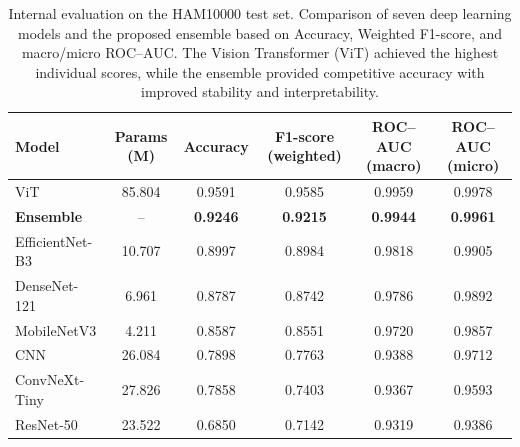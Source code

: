 \documentclass[pdflatex,sn-mathphys-num]{sn-jnl}%
\theoremstyle{thmstyleone}%
\theoremstyle{thmstyletwo}%
\theoremstyle{thmstylethree}%
\begin{document}
\captionsetup[table]{font=footnotesize, labelfont=bf, skip=6pt}

\begin{table}[!htbp]
\caption{Internal evaluation on the HAM10000 test set. 
Comparison of seven deep learning models and the proposed ensemble based on Accuracy, Weighted F1-score, and macro/micro ROC–AUC. 
The Vision Transformer (ViT) achieved the highest individual scores, while the ensemble provided competitive accuracy with improved stability and interpretability.}
\label{tab:ham10000-results}
\centering
\footnotesize
\setlength{\tabcolsep}{4pt}
\renewcommand{\arraystretch}{1.1}
\begin{tabular*}{\textwidth}{@{\extracolsep\fill}lccccc}
\toprule
\textbf{Model} & \textbf{Params (M)} & \textbf{Accuracy} & \textbf{F1-score (weighted)} & \textbf{ROC–AUC (macro)} & \textbf{ROC–AUC (micro)} \\
\midrule
ViT             & 85.804  & 0.9591 & 0.9585 & 0.9959 & 0.9978 \\
\textbf{Ensemble} & {--} & \textbf{0.9246} & \textbf{0.9215} & \textbf{0.9944} & \textbf{0.9961} \\
EfficientNet-B3 & 10.707  & 0.8997 & 0.8984 & 0.9818 & 0.9905 \\
DenseNet-121    & 6.961   & 0.8787 & 0.8742 & 0.9786 & 0.9892 \\
MobileNetV3     & 4.211   & 0.8587 & 0.8551 & 0.9720 & 0.9857 \\
CNN             & 26.084  & 0.7898 & 0.7763 & 0.9388 & 0.9712 \\
ConvNeXt-Tiny   & 27.826  & 0.7858 & 0.7403 & 0.9367 & 0.9593 \\
ResNet-50       & 23.522  & 0.6850 & 0.7142 & 0.9319 & 0.9386 \\
\bottomrule
\end{tabular*}
\end{table}
\end{document}
